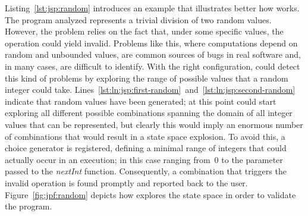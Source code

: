 Listing~\ref{lst:jsp:random} introduces an example that illustrates better how \jpf{} works. The program analyzed represents a trivial division of two random values. However, the problem relies on the fact that, under some specific values, the operation could yield invalid. Problems like this, where computations depend on random and unbounded values, are common sources of bugs in real software and, in many cases, are difficult to identify. With the right configuration, \jpf{} could detect this kind of problems by exploring the range of possible values that a random integer could take. Lines~\ref{lst:ln:jsp:first-random}~and~\ref{lst:ln:jsp:second-random} indicate that random values have been generated; at this point \jpf{} could start exploring all different possible combinations spanning the domain of all integer values that can be represented, but clearly this would imply an enormous number of combinations that would result in a state space explosion. To avoid this, a choice generator is registered, defining a minimal range of integers that could actually occur in an execution; in this case ranging from~0 to the parameter passed to the \textit{nextInt} function. Consequently, a combination that triggers the invalid operation is found promptly and reported back to the user. Figure~\ref{fig:jpf:random} depicts how \jpf{} explores the state space in order to validate the program.

